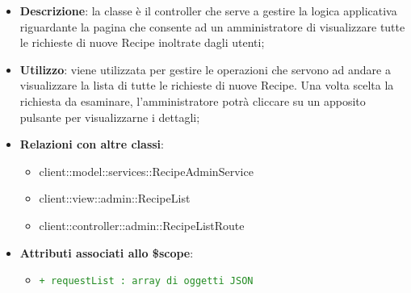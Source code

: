 			\begin{itemize}
				\item \textbf{Descrizione}: la classe è il controller che serve a gestire la logica applicativa riguardante la pagina che consente ad un amministratore di visualizzare tutte le richieste di nuove Recipe inoltrate dagli utenti;
				\item \textbf{Utilizzo}: viene utilizzata per gestire le operazioni che servono ad andare a visualizzare la lista di tutte le richieste di nuove Recipe. Una volta scelta la richiesta da esaminare, l'amministratore potrà cliccare su un apposito pulsante per visualizzarne i dettagli;
				\item \textbf{Relazioni con altre classi}:
					\begin{itemize}
						\item client::model::services::RecipeAdminService
						\item client::view::admin::RecipeList
						\item client::controller::admin::RecipeListRoute
					\end{itemize}

				\item \textbf{Attributi associati allo \$scope}:
					\begin{itemize}
						\item \textcolor{forestgreen}{\texttt{+ requestList : array di oggetti JSON}}

					\end{itemize}


\end{itemize}
